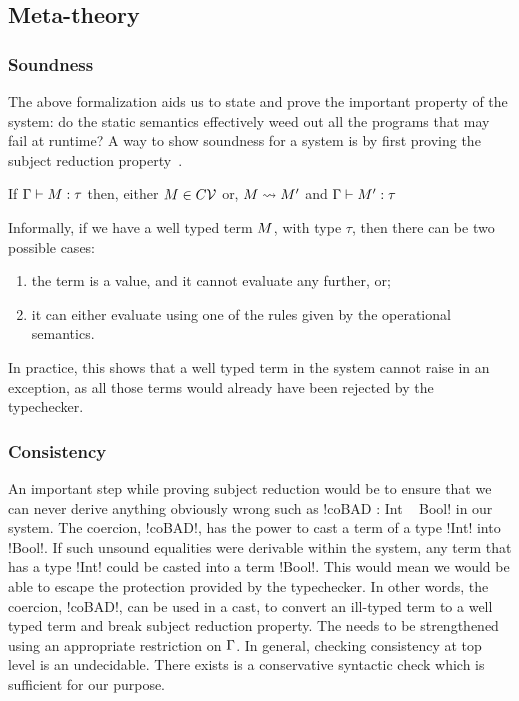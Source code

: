 \documentclass[screen,nonacm,manuscript,review]{acmart} %
\begin{document}
\subsection{Meta-theory}
\subsubsection{Soundness}
The above formalization aids us to state and prove
the important property of the system: do the static semantics
effectively weed out all the programs that may fail at runtime?
A way to show soundness for a system is by first proving the subject
reduction property~\cite{wright_syntactic_1994}.

\begin{claim}\label{claim:sfc-ty-safety}
 If $\Gamma \vdash M : \tau$ then, either $M \in C\mathcal{V}$ or, $M \rightsquigarrow M'$ and
 $\Gamma \vdash M' : \tau$
\end{claim}

Informally, if we have a well typed term $M$, with type $\tau$, then
there can be two possible cases:
\begin{enumerate}
\item the term is a value, and it cannot evaluate any further, or;
\item it can either evaluate using one of the rules given by the
  operational semantics.
\end{enumerate}
In practice, this shows that a well typed term in the system
cannot raise in an exception, as all those terms would already have
been rejected by the typechecker.

\subsubsection{Consistency}
An important step while proving subject reduction would be to ensure that we
can never derive anything obviously wrong such as !coBAD : Int ~ Bool!
in our system. The coercion, !coBAD!, has the power to cast a term of
a type !Int! into !Bool!. If such unsound equalities were
derivable within the system, any term that has a type !Int! could be
casted into a term !Bool!. This would mean we would be able to escape
the protection provided by the typechecker. In other words, the
coercion, !coBAD!, can be used in a cast, to convert an ill-typed term
to a well typed term and break subject reduction property. The
 needs to be strengthened using an
appropriate restriction on $\Gamma$. In general, checking consistency
at top level is an undecidable. There exists is a conservative
syntactic check which is sufficient for our purpose.
\end{document}
